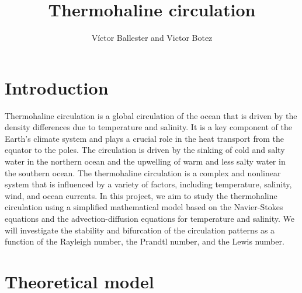 \documentclass{article}
\title{Thermohaline circulation}
\author{Víctor Ballester and Victor Botez}
\date{\parbox{\linewidth}{\centering
Computational Fluid Dynamics\endgraf
M2 - Applied and Theoretical Mathematics\endgraf
Université Paris-Dauphine, PSL\endgraf
\today}}
\begin{document}
\maketitle

\section{Introduction}
Thermohaline circulation is a global circulation of the ocean that is driven by the density differences due to temperature and salinity. It is a key component of the Earth's climate system and plays a crucial role in the heat transport from the equator to the poles. The circulation is driven by the sinking of cold and salty water in the northern ocean and the upwelling of warm and less salty water in the southern ocean. The thermohaline circulation is a complex and nonlinear system that is influenced by a variety of factors, including temperature, salinity, wind, and ocean currents. In this project, we aim to study the thermohaline circulation using a simplified mathematical model based on the Navier-Stokes equations and the advection-diffusion equations for temperature and salinity. We will investigate the stability and bifurcation of the circulation patterns as a function of the Rayleigh number, the Prandtl number, and the Lewis number.

\section{Theoretical model}
\end{document}
